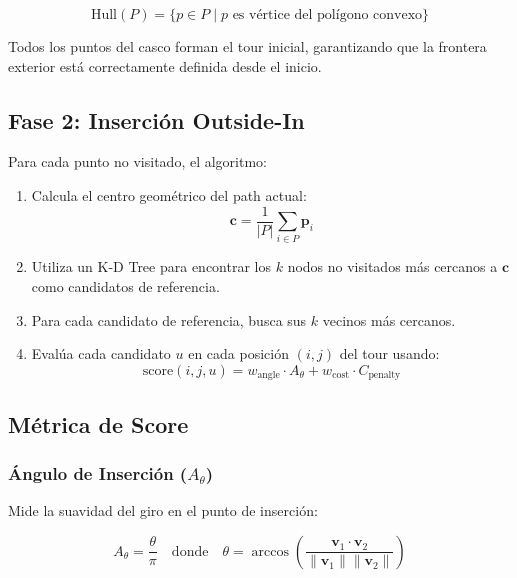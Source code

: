 \documentclass[12pt, a4paper]{article}
\begin{document}
\begin{equation}
\text{Hull}(P) = \{p \in P \mid p \text{ es vértice del polígono convexo}\}
\end{equation}

Todos los puntos del casco forman el tour inicial, garantizando que la frontera exterior está correctamente definida desde el inicio.

\subsection{Fase 2: Inserción Outside-In}

Para cada punto no visitado, el algoritmo:

\begin{enumerate}
    \item Calcula el centro geométrico del path actual:
    \begin{equation}
    \mathbf{c} = \frac{1}{|P|} \sum_{i \in P} \mathbf{p}_i
    \end{equation}
    
    \item Utiliza un K-D Tree para encontrar los $k$ nodos no visitados más cercanos a $\mathbf{c}$ como candidatos de referencia.
    
    \item Para cada candidato de referencia, busca sus $k$ vecinos más cercanos.
    
    \item Evalúa cada candidato $u$ en cada posición $(i, j)$ del tour usando:
    \begin{equation}
    \text{score}(i, j, u) = w_{\text{angle}} \cdot A_\theta + w_{\text{cost}} \cdot C_{\text{penalty}}
    \end{equation}
\end{enumerate}

\subsection{Métrica de Score}

\subsubsection{Ángulo de Inserción ($A_\theta$)}

Mide la suavidad del giro en el punto de inserción:

\begin{equation}
A_\theta = \frac{\theta}{\pi} \quad \text{donde} \quad \theta = \arccos\left(\frac{\mathbf{v}_1 \cdot \mathbf{v}_2}{\|\mathbf{v}_1\| \|\mathbf{v}_2\|}\right)
\end{equation}
\end{document}
